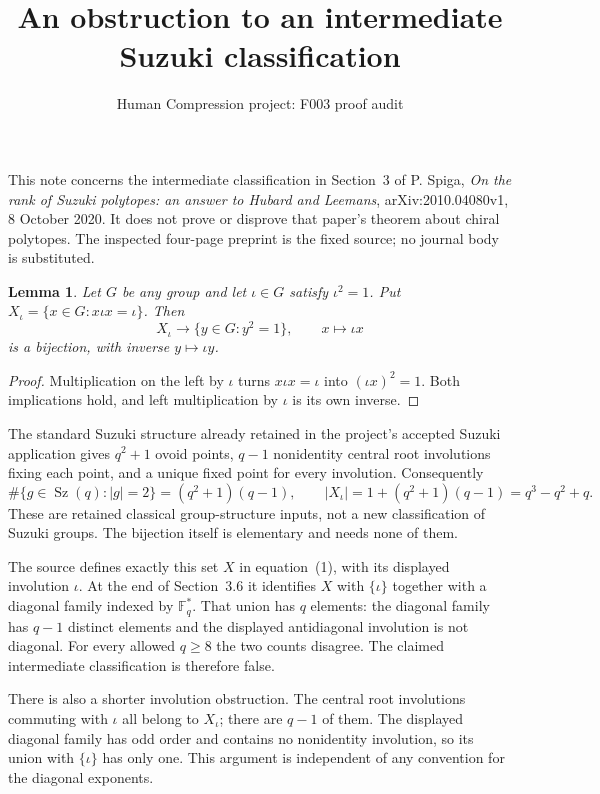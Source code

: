 \documentclass[11pt,a4paper]{article}
\title{An obstruction to an intermediate Suzuki classification}
\author{Human Compression project: F003 proof audit}
\date{}
\newtheorem{lemma}{Lemma}
\begin{document}
\maketitle
This note concerns the intermediate classification in Section~3 of
P. Spiga, \emph{On the rank of Suzuki polytopes: an answer to Hubard
and Leemans}, arXiv:2010.04080v1, 8 October 2020. It does not prove
or disprove that paper's theorem about chiral polytopes. The inspected
four-page preprint is the fixed source; no journal body is substituted.

\begin{lemma}
Let $G$ be any group and let $\iota\in G$ satisfy $\iota^2=1$.
Put $X_\iota=\{x\in G:x\iota x=\iota\}$. Then
\[
 X_\iota\longrightarrow\{y\in G:y^2=1\},\qquad x\longmapsto\iota x
\]
is a bijection, with inverse $y\mapsto\iota y$.
\end{lemma}
\begin{proof}
Multiplication on the left by $\iota$ turns $x\iota x=\iota$
into $(\iota x)^2=1$. Both implications hold, and left multiplication
by $\iota$ is its own inverse.
\end{proof}

The standard Suzuki structure already retained in the project's
accepted Suzuki application gives $q^2+1$ ovoid points, $q-1$
nonidentity central root involutions fixing each point, and a unique
fixed point for every involution. Consequently
\[
 \#\{g\in\operatorname{Sz}(q):|g|=2\}=(q^2+1)(q-1),\qquad
 |X_\iota|=1+(q^2+1)(q-1)=q^3-q^2+q.
\]
These are retained classical group-structure inputs, not a new
classification of Suzuki groups. The bijection itself is elementary
and needs none of them.

The source defines exactly this set $X$ in equation~(1), with its
displayed involution $\iota$. At the end of Section~3.6 it identifies
$X$ with $\{\iota\}$ together with a diagonal family indexed by
$\mathbb F_q^*$. That union has $q$ elements: the diagonal family
has $q-1$ distinct elements and the displayed antidiagonal involution
is not diagonal. For every allowed $q\ge8$ the two counts disagree.
The claimed intermediate classification is therefore false.

There is also a shorter involution obstruction. The central root
involutions commuting with $\iota$ all belong to $X_\iota$; there
are $q-1$ of them. The displayed diagonal family has odd order and
contains no nonidentity involution, so its union with $\{\iota\}$
has only one. This argument is independent of any convention for
the diagonal exponents.
\end{document}
